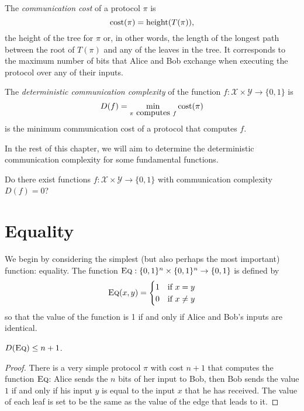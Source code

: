 \begin{definition}
	The \emph{communication cost} of a protocol $\pi$ is 
	\[
	\mathrm{cost}(\pi) = \mathrm{height}(T(\pi)),
	\]
	the height of the tree for $\pi$ or, in other words, the length of the longest path between the root of $T(\pi)$ and any of the leaves in the tree.
	It corresponds to the maximum number of bits that Alice and Bob exchange when executing the protocol over any of their inputs.
\end{definition}


\begin{definition}
	The \emph{deterministic communication complexity} of the function $f : \mathcal{X} \times \mathcal{Y} \to \{0,1\}$ is
	\[
	D(f) = \min_{\pi \mbox{ computes } f} \mathrm{cost}(\pi)
	\]
	is the minimum communication cost of a protocol that computes $f$.
\end{definition}

In the rest of this chapter, we will aim to determine the deterministic communication complexity for some fundamental functions.

\exercises

\begin{exercise} %
	Do there exist functions $f : \mathcal{X} \times \mathcal{Y} \to \{0,1\}$ with  communication complexity $D(f) = 0$?
\end{exercise}


\section{Equality}
We begin by considering the simplest (but also perhaps the most important) function: equality. The function $\textsc{Eq} : \{0,1\}^n \times \{0,1\}^n \to \{0,1\}$ is defined by
\[
\textsc{Eq}(x,y) = \begin{cases}
1 & \mbox{if } x = y \\
0 & \mbox{if } x \neq y
\end{cases}
\]
so that the value of the function is 1 if and only if Alice and Bob's inputs are identical.

\begin{theorem}
	$D(\textsc{Eq}) \le n + 1$.
\end{theorem}

\begin{proof}
	There is a very simple protocol $\pi$ with cost $n+1$ that computes the function $\textsc{Eq}$: Alice sends the $n$ bits of her input to Bob, then Bob sends the value $1$ if and only if his input $y$ is equal to the input $x$ that he has received. The value of each leaf is set to be the same as the value of the edge that leads to it.
\end{proof}


